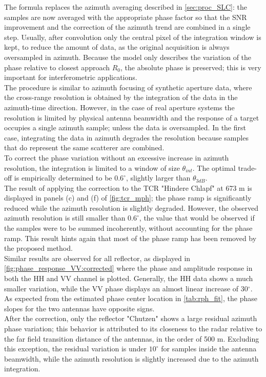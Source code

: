 The formula replaces the azimuth averaging described in \autoref{sec:proc_SLC}: the samples are now averaged with the appropriate phase factor so that the SNR improvement and the correction of the azimuth trend are combined in a single step. Usually, after convolution only the central pixel of the integration window is kept, to reduce the amount of data, as the original acquisition is always oversampled in azimuth. Because the model only describes the variation of the phase relative to closest approach $R_{0}$, the absolute phase is preserved; this is very important for interferometric applications.\\
The procedure is similar to azimuth focusing of synthetic aperture data, where the cross-range resolution is obtained by the integration of the data in the azimuth-time direction. However, in the case of real aperture systems the resolution is limited by physical antenna beamwidth and the response of a target  occupies a single azimuth sample; unless the data is oversampled. In the first case, integrating the data in azimuth degrades the resolution because samples that do represent the same scatterer are combined.\\ To correct the phase variation without an excessive increase in azimuth resolution, the integration is limited to a window of size $\theta_{int}$. The optimal trade-off is empirically determined to be $0.6^\circ$, slightly larger than $\theta_{3dB}$.\\
The result of applying the correction to the TCR "Hindere Chlapf" at 673 m is displayed in panels (c) and (f) of \autoref{fig:tcr_mph}; the phase ramp is significantly reduced while the azimuth resolution is slightly degraded. However, the observed azimuth resolution is still smaller than $0.6^\circ$, the value that would be observed if the samples were to be summed incoherently, without accounting for the phase ramp. This result hints again that  most of the phase ramp has been removed by the proposed method.\\
Similar results are observed for all reflector, as displayed in \autoref{fig:phase_response_VV:corrected} where the phase and amplitude response in both the HH and VV channel is plotted. Generally, the HH data shows a much smaller variation, while the VV phase displays an almost linear increase of 30$^\circ$. As expected from the estimated phase center location in \autoref{tab:rph_fit}, the phase slopes for the two antennas have opposite signs.\\  After the correction, only the reflector "Chutzen" shows a large residual azimuth phase variation; this behavior is attributed to its closeness to the radar relative to the far field transition distance of the antennas, in the order of 500 m. Excluding this exception, the residual variation is under $10^\circ$ for samples inside the antenna beamwidth, while the azimuth resolution is slightly increased due to the azimuth integration.
